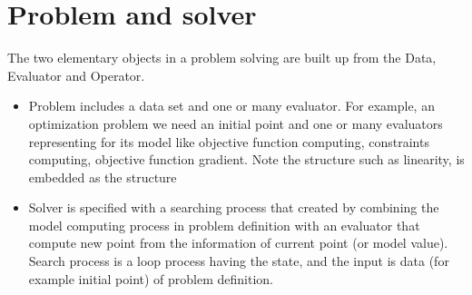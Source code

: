 \documentclass{report}
\begin{document}
\section{Problem and solver}
\par The two elementary objects in a problem solving are built up from the Data, Evaluator and Operator.
\begin{itemize}
\item Problem includes a data set and one or many evaluator. For example, an optimization problem we need
  an initial point and one or many evaluators representing for its model like objective
  function computing, constraints computing, objective function gradient. Note the structure such as linearity,
  is embedded as the structure
\item Solver is specified with a searching process that created by combining the model computing process in
  problem definition with an evaluator that compute new point from the information of current point (or model value).
  Search process is a loop process having the state, and the input is data (for example initial point) of
  problem definition.
\end{itemize}
\end{document}
